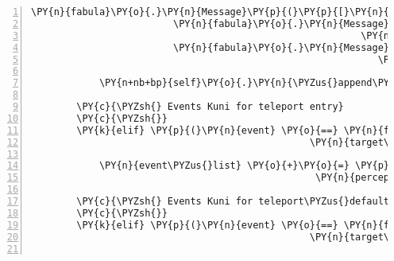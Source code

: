 \begin{Verbatim}[commandchars=\\\{\},numbers=left,firstnumber=1,stepnumber=1]
                         \PY{n}{fabula}\PY{o}{.}\PY{n}{Message}\PY{p}{(}\PY{p}{[}\PY{n}{fabula}\PY{o}{.}\PY{n}{DeleteEvent}\PY{p}{(}\PY{l+s}{\PYZsq{}}\PY{l+s}{goblet\PYZus{}filled}\PY{l+s}{\PYZsq{}}\PY{p}{)}\PY{p}{]}\PY{p}{)}\PY{p}{,}
                         \PY{n}{fabula}\PY{o}{.}\PY{n}{Message}\PY{p}{(}\PY{p}{[}\PY{n}{fabula}\PY{o}{.}\PY{n}{SaysEvent}\PY{p}{(}\PY{n}{identifier}\PY{o}{=}\PY{n}{ID\PYZus{}KUNI}\PY{p}{,}
                                                          \PY{n}{text}\PY{o}{=}\PY{l+s}{\PYZsq{}}\PY{l+s}{Ähm...vielen Dank!}\PY{l+s}{\PYZsq{}}\PY{p}{)}\PY{p}{]}\PY{p}{)}\PY{p}{,}
                         \PY{n}{fabula}\PY{o}{.}\PY{n}{Message}\PY{p}{(}\PY{p}{[}\PY{n}{fabula}\PY{o}{.}\PY{n}{PicksUpEvent}\PY{p}{(}\PY{n}{identifier}\PY{o}{=}\PY{n}{ID\PYZus{}KUNI}\PY{p}{,}
                                                             \PY{n}{item\PYZus{}identifier}\PY{o}{=}\PY{l+s}{\PYZsq{}}\PY{l+s}{string\PYZus{}harp}\PY{l+s}{\PYZsq{}}\PY{p}{)}\PY{p}{]}\PY{p}{)}\PY{p}{]}

            \PY{n+nb+bp}{self}\PY{o}{.}\PY{n}{\PYZus{}append\PYZus{}sentence}\PY{p}{(}\PY{n}{ID\PYZus{}KUNI}\PY{p}{,} \PY{l+s}{\PYZsq{}}\PY{l+s}{Ich habe eine Saite von einer Harfe.}\PY{l+s}{\PYZsq{}}\PY{p}{)}

        \PY{c}{\PYZsh{} Events Kuni for teleport entry}
        \PY{c}{\PYZsh{}}
        \PY{k}{elif} \PY{p}{(}\PY{n}{event} \PY{o}{==} \PY{n}{fabula}\PY{o}{.}\PY{n}{TriesToLookAtEvent}\PY{p}{(}\PY{n}{identifier}\PY{o}{=}\PY{n}{ID\PYZus{}KUNI}\PY{p}{,}
                                                 \PY{n}{target\PYZus{}identifier}\PY{o}{=}\PY{l+s}{\PYZsq{}}\PY{l+s}{teleport\PYZus{}entry}\PY{l+s}{\PYZsq{}}\PY{p}{)}\PY{p}{)}\PY{p}{:}

            \PY{n}{event\PYZus{}list} \PY{o}{+}\PY{o}{=} \PY{p}{[}\PY{n}{fabula}\PY{o}{.}\PY{n}{PerceptionEvent}\PY{p}{(}\PY{n}{identifier}\PY{o}{=}\PY{n}{ID\PYZus{}KUNI}\PY{p}{,}
                                                  \PY{n}{perception}\PY{o}{=}\PY{l+s}{\PYZsq{}}\PY{l+s}{Hier geht es weiter Richtung Zauberwald.}\PY{l+s}{\PYZsq{}}\PY{p}{)}\PY{p}{]}

        \PY{c}{\PYZsh{} Events Kuni for teleport\PYZus{}default}
        \PY{c}{\PYZsh{}}
        \PY{k}{elif} \PY{p}{(}\PY{n}{event} \PY{o}{==} \PY{n}{fabula}\PY{o}{.}\PY{n}{TriesToLookAtEvent}\PY{p}{(}\PY{n}{identifier}\PY{o}{=}\PY{n}{ID\PYZus{}KUNI}\PY{p}{,}
                                                 \PY{n}{target\PYZus{}identifier}\PY{o}{=}\PY{l+s}{\PYZsq{}}\PY{l+s}{teleport\PYZus{}default}\PY{l+s}{\PYZsq{}}\PY{p}{)}\PY{p}{)}\PY{p}{:}


\end{Verbatim}
